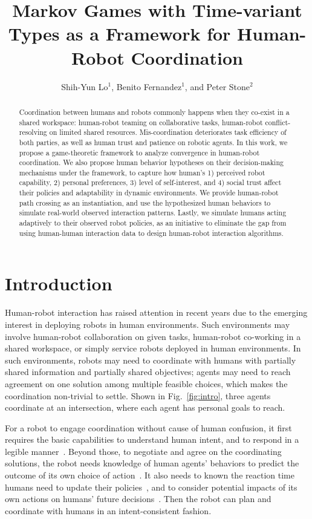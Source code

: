 \documentclass[letterpaper, 10 pt, conference]{ieeeconf}  %
\title{\LARGE \bf
Markov Games with Time-variant Types as a Framework for Human-Robot Coordination
}
\author{Shih-Yun Lo$^{1}$, Benito Fernandez$^{1}$, and Peter Stone$^{2}$%
}
\begin{document}
\maketitle
\thispagestyle{empty}
\pagestyle{empty}
\begin{abstract}
  Coordination between humans and robots commonly happens when they 
  co-exist in a shared workspace: human-robot teaming on collaborative tasks, 
  human-robot conflict-resolving on limited shared resources. Mis-coordination 
  deteriorates task 
  efficiency of both parties, as well as human trust and patience on robotic 
  agents. In this work, we propose a game-theoretic framework to analyze convergence in 
  human-robot coordination.
  We also propose human behavior hypotheses on their 
  decision-making mechanisms under the framework, 
  to capture how human's 1) perceived robot 
  capability, 2) personal preferences, 3) level of self-interest, and 4) social 
  trust affect their policies and adaptability in dynamic environments. 
  We provide human-robot path crossing as an instantiation, and use the 
  hypothesized human behaviors to simulate real-world observed interaction 
  patterns. Lastly, we simulate humans acting adaptively to their observed robot 
  policies, as an initiative to eliminate the gap from using human-human 
  interaction data to design human-robot interaction algorithms. 
\end{abstract}

\section{Introduction}
Human-robot interaction has raised attention in recent years due to the 
emerging interest in deploying robots in human environments. Such 
environments may involve human-robot collaboration on given tasks, 
human-robot co-working in a shared workspace, or simply service 
robots deployed in human environments. In such environments, robots 
may need to coordinate with humans with partially shared information and 
partially shared objectives; agents may need to reach agreement on one 
solution among multiple feasible choices, which makes the coordination non-trivial to 
settle. Shown in Fig.~\ref{fig:intro}, three agents coordinate at an 
intersection, where each agent has personal goals to reach. 

For a robot to engage coordination without cause of human confusion, it first 
requires the basic capabilities to understand human intent, and to respond in a 
legible manner~\cite{dragan13legibility}. Beyond those, to negotiate and agree on the coordinating 
solutions, the robot needs knowledge of human agents' behaviors to 
predict the outcome of its own choice of action~\cite{aumann1987correlated}. 
It also needs to known the reaction time humans need 
to update their policies~\cite{shah2011improved}, and to consider potential 
impacts of its own actions on humans' future 
decisions~\cite{fujiwara2015non,foerster2017learning}. Then the 
robot can plan and coordinate with humans in an intent-consistent fashion. 
\end{document}
